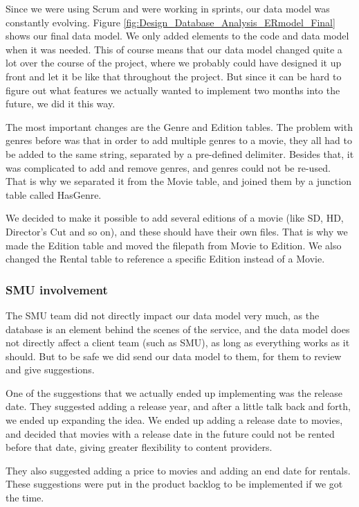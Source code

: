 Since we were using Scrum and were working in sprints, our data model was constantly evolving. Figure \ref{fig:Design_Database_Analysis_ERmodel_Final} shows our final data model. We only added elements to the code and data model when it was needed. This of course means that our data model changed quite a lot over the course of the project, where we probably could have designed it up front and let it be like that throughout the project. But since it can be hard to figure out what features we actually wanted to implement two months into the future, we did it this way.

The most important changes are the Genre and Edition tables. The problem with genres before was that in order to add multiple genres to a movie, they all had to be added to the same string, separated by a pre-defined delimiter. Besides that, it was complicated to add and remove genres, and genres could not be re-used. That is why we separated it from the Movie table, and joined them by a junction table called HasGenre.

We decided to make it possible to add several editions of a movie (like SD, HD, Director's Cut and so on), and these should have their own files. That is why we made the Edition table and moved the filepath from Movie to Edition. We also changed the Rental table to reference a specific Edition instead of a Movie.

\subsubsection{SMU involvement}
\label{Design_Database_Analysis_SMU}

The SMU team did not directly impact our data model very much, as the database is an element behind the scenes of the service, and the data model does not directly affect a client team (such as SMU), as long as everything works as it should. But to be safe we did send our data model to them, for them to review and give suggestions.

One of the suggestions that we actually ended up implementing was the release date. They suggested adding a release year, and after a little talk back and forth, we ended up expanding the idea. We ended up adding a release date to movies, and decided that movies with a release date in the future could not be rented before that date, giving greater flexibility to content providers.

They also suggested adding a price to movies and adding an end date for rentals. These suggestions were put in the product backlog to be implemented if we got the time.


